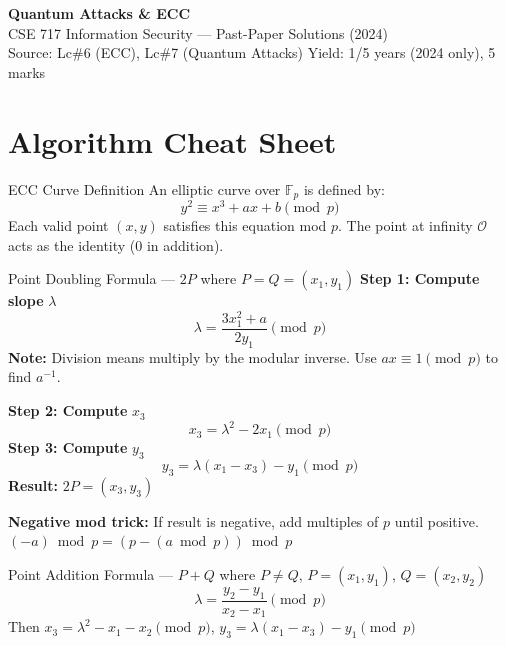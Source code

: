 \documentclass[12pt,a4paper]{article}
\begin{document}
\begin{center}
  {\LARGE\bfseries\color{folblue} Quantum Attacks \& ECC}\\[4pt]
  {\large CSE 717 Information Security --- Past-Paper Solutions (2024)}\\[2pt]
  {\small Source: Lc\#6 (ECC), Lc\#7 (Quantum Attacks) \quad Yield: 1/5 years (2024 only), 5 marks}
\end{center}
\vspace{0.5em}

\section{Algorithm Cheat Sheet}

\begin{algobox}{ECC Curve Definition}
An elliptic curve over $\mathbb{F}_p$ is defined by:
\[
  y^2 \equiv x^3 + ax + b \pmod{p}
\]
Each valid point $(x,y)$ satisfies this equation mod $p$. The point at infinity $\mathcal{O}$ acts as the identity (0 in addition).
\end{algobox}

\vspace{0.5em}

\begin{algobox}{Point Doubling Formula --- $2P$ where $P = Q = (x_1, y_1)$}
\textbf{Step 1: Compute slope} $\lambda$
\[
  \lambda = \frac{3x_1^2 + a}{2y_1} \pmod{p}
\]
\textbf{Note:} Division means multiply by the modular inverse. Use $ax \equiv 1 \pmod{p}$ to find $a^{-1}$.

\medskip
\textbf{Step 2: Compute} $x_3$
\[
  x_3 = \lambda^2 - 2x_1 \pmod{p}
\]
\textbf{Step 3: Compute} $y_3$
\[
  y_3 = \lambda(x_1 - x_3) - y_1 \pmod{p}
\]
\textbf{Result:} $2P = (x_3, y_3)$

\medskip
\textbf{Negative mod trick:} If result is negative, add multiples of $p$ until positive.
$(-a) \bmod p = (p - (a \bmod p)) \bmod p$
\end{algobox}

\vspace{0.5em}

\begin{algobox}{Point Addition Formula --- $P + Q$ where $P \neq Q$, $P=(x_1,y_1)$, $Q=(x_2,y_2)$}
\[
  \lambda = \frac{y_2 - y_1}{x_2 - x_1} \pmod{p}
\]
Then $x_3 = \lambda^2 - x_1 - x_2 \pmod{p}$, \quad $y_3 = \lambda(x_1 - x_3) - y_1 \pmod{p}$
\end{algobox}
\end{document}
